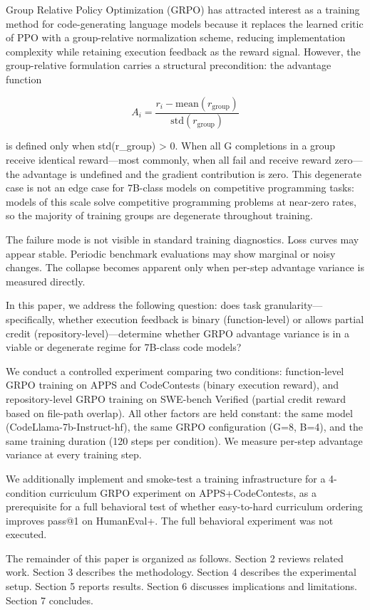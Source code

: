 
Group Relative Policy Optimization (GRPO) has attracted interest as a training method for code-generating language models because it replaces the learned critic of PPO with a group-relative normalization scheme, reducing implementation complexity while retaining execution feedback as the reward signal. However, the group-relative formulation carries a structural precondition: the advantage function

$$A_i = \frac{r_i - \text{mean}(r_{\text{group}})}{\text{std}(r_{\text{group}})}$$

is defined only when std(r_group) > 0. When all G completions in a group receive identical reward—most commonly, when all fail and receive reward zero—the advantage is undefined and the gradient contribution is zero. This degenerate case is not an edge case for 7B-class models on competitive programming tasks: models of this scale solve competitive programming problems at near-zero rates, so the majority of training groups are degenerate throughout training.

The failure mode is not visible in standard training diagnostics. Loss curves may appear stable. Periodic benchmark evaluations may show marginal or noisy changes. The collapse becomes apparent only when per-step advantage variance is measured directly.

In this paper, we address the following question: does task granularity—specifically, whether execution feedback is binary (function-level) or allows partial credit (repository-level)—determine whether GRPO advantage variance is in a viable or degenerate regime for 7B-class code models?

We conduct a controlled experiment comparing two conditions: function-level GRPO training on APPS and CodeContests (binary execution reward), and repository-level GRPO training on SWE-bench Verified (partial credit reward based on file-path overlap). All other factors are held constant: the same model (CodeLlama-7b-Instruct-hf), the same GRPO configuration (G=8, B=4), and the same training duration (120 steps per condition). We measure per-step advantage variance at every training step.

We additionally implement and smoke-test a training infrastructure for a 4-condition curriculum GRPO experiment on APPS+CodeContests, as a prerequisite for a full behavioral test of whether easy-to-hard curriculum ordering improves pass@1 on HumanEval+. The full behavioral experiment was not executed.

The remainder of this paper is organized as follows. Section 2 reviews related work. Section 3 describes the methodology. Section 4 describes the experimental setup. Section 5 reports results. Section 6 discusses implications and limitations. Section 7 concludes.
